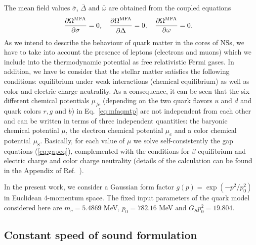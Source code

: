 \documentclass[%
 reprint,
superscriptaddress,
nofootinbib,
 amsmath,amssymb,
 aps,
]{revtex4-1}
\begin{document}
The mean field values $\bar \sigma$, $\bar \Delta$ and $\bar \omega$ are obtained from the coupled equations
\begin{equation}
\frac{ \partial \Omega^{\rm MFA}}{\partial\bar \sigma} = 0, \quad 
\frac{ \partial \Omega^{\rm MFA}}{\partial\bar \Delta} = 0, \quad 
\frac{\partial \Omega^{\rm MFA}}{\partial\bar \omega} = 0.
\label{eq:gapeq}
\end{equation}
As we intend to describe the behaviour of quark matter in the cores of NSs, we have to take into account the presence of leptons (electrons and muons) which we include into the thermodynamic potential as free relativistic Fermi gases. 
In addition, we have to consider that the stellar matter satisfies the following conditions: equilibrium under weak interactions (chemical equilibrium) as well as color and electric charge neutrality. 
As a consequence, it can be seen that the six different chemical potentials $\mu_{fc}$  (depending on the two quark flavors $u$ and $d$ and quark colors $r,g$ and $b$) in 
Eq.~\eqref{eq:mfaqmtp} are not independent from each other and can be written in terms of three independent quantities: the baryonic chemical potential $\mu$, the electron chemical potential $\mu_e$ and a color chemical potential $\mu_8$. 
Basically, for each value of $\mu$ we solve self-consistently the gap equations (\ref{eq:gapeq}), complemented with  the  conditions for $\beta$-equilibrium and electric charge and color charge neutrality (details of the calculation can be found in the Appendix of Ref.~\cite{Blaschke:2007ri}).

In the present work, we consider a Gaussian form factor $g(p)=\exp (-p^2/p_0^2)$ in Euclidean 4-momentum space. The fixed input parameters of the quark model considered here are $m_c=5.4869$ MeV, $p_0=782.16$ MeV and $G_S p_0^2 = 19.804$. 


\subsection{Constant speed of sound formulation}
\end{document}
